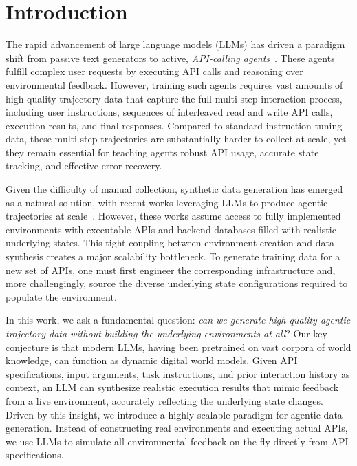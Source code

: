\section{Introduction}
The rapid advancement of large language models (LLMs) has driven a paradigm shift from passive text generators to active, \emph{API-calling agents}~\citep{schick2023toolformer, yao2023react}. These agents fulfill complex user requests by executing API calls and reasoning over environmental feedback. However, training such agents requires vast amounts of high-quality trajectory data that capture the full multi-step interaction process, including user instructions, sequences of interleaved read and write API calls, execution results, and final responses. Compared to standard instruction-tuning data, these multi-step trajectories are substantially harder to collect at scale, yet they remain essential for teaching agents robust API usage, accurate state tracking, and effective error recovery.

Given the difficulty of manual collection, synthetic data generation has emerged as a natural solution, with recent works leveraging LLMs to produce agentic trajectories at scale~\citep{toolllm, agenttuning, apigen, xu2026controllable, lu2026firefly}. However, these works assume access to fully implemented environments with executable APIs and backend databases filled with realistic underlying states. This tight coupling between environment creation and data synthesis creates a major scalability bottleneck. To generate training data for a new set of APIs, one must first engineer the corresponding infrastructure and, more challengingly, source the diverse underlying state configurations required to populate the environment.



In this work, we ask a fundamental question: \emph{can we generate high-quality agentic trajectory data without building the underlying environments at all}? Our key conjecture is that modern LLMs, having been pretrained on vast corpora of world knowledge, can function as dynamic digital world models. Given API specifications, input arguments, task instructions, and prior interaction history as context, an LLM can synthesize realistic execution results that mimic feedback from a live environment, accurately reflecting the underlying state changes. Driven by this insight, we introduce a highly scalable paradigm for agentic data generation. Instead of constructing real environments and executing actual APIs, we use LLMs to simulate all environmental feedback on-the-fly directly from API specifications.

